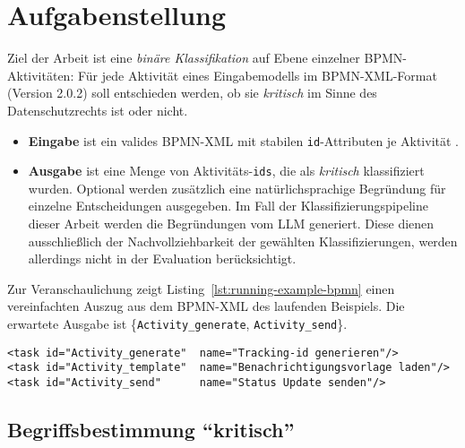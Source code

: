 \section{Aufgabenstellung}\label{sec:aufgabenstellung}

Ziel der Arbeit ist eine \emph{binäre Klassifikation} auf Ebene einzelner \ac{BPMN}-Aktivitäten: Für jede Aktivität eines Eingabemodells im \ac{BPMN}-XML-Format (Version 2.0.2) \cite{omgbpmn} soll entschieden werden, ob sie \emph{kritisch} im Sinne des Datenschutzrechts ist oder nicht.

\begin{itemize}
    \item \textbf{Eingabe} ist ein valides \ac{BPMN}-XML mit stabilen \texttt{id}-Attributen je Aktivität \cite{omgbpmn}.
    \item \textbf{Ausgabe} ist eine Menge von Aktivitäts-\texttt{ids}, die als \emph{kritisch} klassifiziert wurden. Optional werden zusätzlich eine natürlichsprachige Begründung für einzelne Entscheidungen ausgegeben. Im Fall der Klassifizierungspipeline dieser Arbeit werden die Begründungen vom \ac{LLM} generiert. Diese dienen ausschließlich der Nachvollziehbarkeit der gewählten Klassifizierungen, werden allerdings nicht in der Evaluation berücksichtigt.
\end{itemize}

Zur Veranschaulichung zeigt Listing~\ref{lst:running-example-bpmn} einen vereinfachten  Auszug aus dem \ac{BPMN}-XML des laufenden Beispiels. Die erwartete Ausgabe ist \{\texttt{Activity\_generate}, \texttt{Activity\_send}\}.

\begin{lstlisting}[caption={BPMN-XML-Auszug des laufenden Beispiels}, label={lst:running-example-bpmn}]
<task id="Activity_generate"  name="Tracking-id generieren"/>
<task id="Activity_template"  name="Benachrichtigungsvorlage laden"/>
<task id="Activity_send"      name="Status Update senden"/>
\end{lstlisting}

\subsection*{Begriffsbestimmung \enquote{kritisch}}

